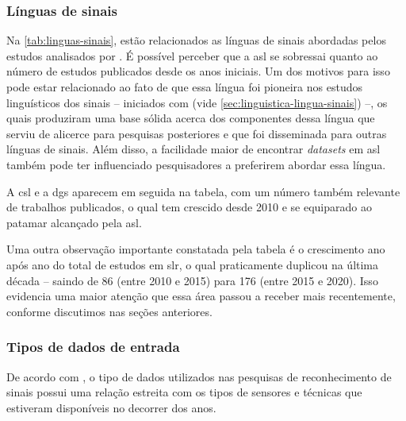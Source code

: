 \subsubsection{Línguas de sinais}
\label{sec:slr-linguas-sinais}

Na \autoref{tab:linguas-sinais}, estão relacionados as línguas de sinais abordadas pelos estudos analisados por . É possível perceber que a \acrfull{asl} se sobressai quanto ao número de estudos publicados desde os anos iniciais. Um dos motivos para isso pode estar relacionado ao fato de que essa língua foi pioneira nos estudos linguísticos dos sinais -- iniciados com  (vide \autoref{sec:linguistica-lingua-sinais}) --, os quais produziram uma base sólida acerca dos componentes dessa língua que serviu de alicerce para pesquisas posteriores e que foi disseminada para outras línguas de sinais. Além disso, a facilidade maior de encontrar \textit{datasets} em \acrshort{asl} também pode ter influenciado pesquisadores a preferirem abordar essa língua.

A \acrfull{csl} e a \acrfull{dgs} aparecem em seguida na tabela, com um número também relevante de trabalhos publicados, o qual tem crescido desde 2010 e se equiparado ao patamar alcançado pela \acrshort{asl}.



Uma outra observação importante constatada pela tabela é o crescimento ano após ano do total de estudos em \acrshort{slr}, o qual praticamente duplicou na última década -- saindo de 86 (entre 2010 e 2015) para 176 (entre 2015 e 2020). Isso evidencia uma maior atenção que essa área passou a receber mais recentemente, conforme discutimos nas seções anteriores.



\subsubsection{Tipos de dados de entrada}
\label{sec:slr-tipos-dados-entrada}

De acordo com , o tipo de dados utilizados nas pesquisas de reconhecimento de sinais possui uma relação estreita com os tipos de sensores e técnicas que estiveram disponíveis no decorrer dos anos. 

